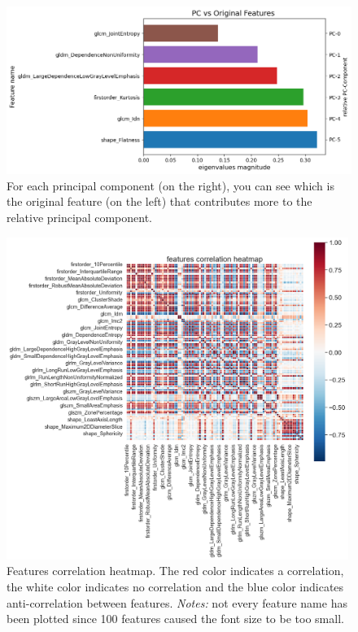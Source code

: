 \documentclass{standalone}
\begin{document}
\begin{figure}[ht]

    
    \includegraphics[width=\textwidth]{../images/importance.png}

    \caption{For each principal component (on the right), you can see which is the original feature (on the left)  that contributes more to the relative principal component.}
    \label{importance}
    
    \end{figure}


\begin{figure}[htp]

    \centering
    \includegraphics[width=0.99\textwidth]{../images/heatmap.png}

    \caption{Features correlation heatmap. The red color indicates a correlation, the white color indicates no correlation and the blue color indicates anti-correlation between features. \textit{Notes:} not every feature name has been plotted since 100 features caused the font size to be too small.}
    \label{heatmap}
    
    \end{figure}
\end{document}
